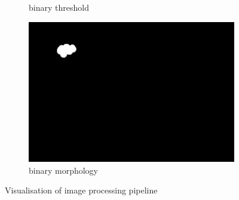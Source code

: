 \documentclass[letter]{article}
\begin{document}
\begin{appendices}
\begin{figure}[h]
\begin{subfigure}[b]{0.4\textwidth}
      \caption{binary threshold}
  \end{subfigure}
  \begin{subfigure}[b]{0.4\textwidth}
      \centering
      \includegraphics[width=\textwidth]{video_binmorph.jpg}
      \caption{binary morphology}
  \end{subfigure}
  \caption{Visualisation of image processing pipeline}

\end{figure}

\end{appendices}
\end{document}
